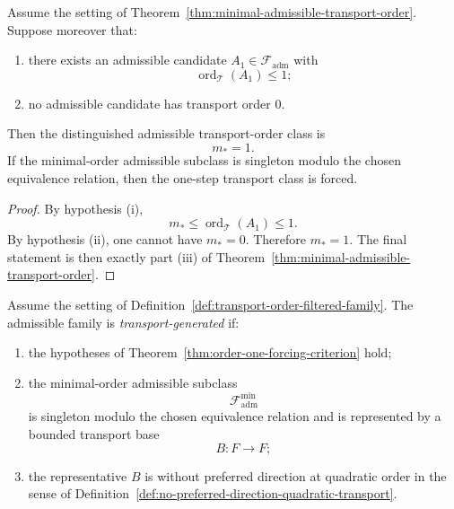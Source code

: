 \begin{theorem}
\label{thm:order-one-forcing-criterion}
Assume the setting of
Theorem~\ref{thm:minimal-admissible-transport-order}. Suppose moreover that:
\begin{enumerate}[label=(\roman*), leftmargin=2em, itemsep=0.2em]
\item there exists an admissible candidate $A_1\in\mathcal F_{\mathrm{adm}}$
      with
      \[
      \operatorname{ord}_{\mathcal T}(A_1)\le 1;
      \]
\item no admissible candidate has transport order $0$.
\end{enumerate}
Then the distinguished admissible transport-order class is
\[
m_\ast=1.
\]
If the minimal-order admissible subclass is singleton modulo the chosen
equivalence relation, then the one-step transport class is forced.
\end{theorem}

\begin{proof}
By hypothesis (i),
\[
m_\ast \le \operatorname{ord}_{\mathcal T}(A_1)\le 1.
\]
By hypothesis (ii), one cannot have $m_\ast=0$. Therefore $m_\ast=1$. The final
statement is then exactly part (iii) of
Theorem~\ref{thm:minimal-admissible-transport-order}.
\end{proof}

\begin{definition}
\label{def:transport-generated-admissible-family}
Assume the setting of Definition~\ref{def:transport-order-filtered-family}. The
admissible family is \emph{transport-generated} if:
\begin{enumerate}[label=(\roman*), leftmargin=2em, itemsep=0.2em]
\item the hypotheses of Theorem~\ref{thm:order-one-forcing-criterion} hold;
\item the minimal-order admissible subclass
      \[
      \mathcal F_{\mathrm{adm}}^{\min}
      \]
      is singleton modulo the chosen equivalence relation and is represented by
      a bounded transport base
      \[
      B:F\to F;
      \]
\item the representative $B$ is without preferred direction at quadratic order
      in the sense of
      Definition~\ref{def:no-preferred-direction-quadratic-transport}.
\end{enumerate}
\end{definition}

